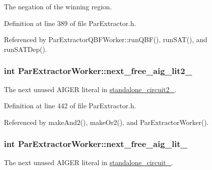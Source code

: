 The negation of the winning region. 



Definition at line 389 of file Par\-Extractor.\-h.



Referenced by Par\-Extractor\-Q\-B\-F\-Worker\-::run\-Q\-B\-F(), run\-S\-A\-T(), and run\-S\-A\-T\-Dep().

\hypertarget{classParExtractorWorker_a334b3096ea7cdb2b3305ac3960aa065a}{
\subsubsection[{next\-\_\-free\-\_\-aig\-\_\-lit2\-\_\-}]{\setlength{\rightskip}{0pt plus 5cm}int Par\-Extractor\-Worker\-::next\-\_\-free\-\_\-aig\-\_\-lit2\-\_\-\hspace{0.3cm}{\ttfamily [protected]}}}\label{classParExtractorWorker_a334b3096ea7cdb2b3305ac3960aa065a}


The next unused A\-I\-G\-E\-R literal in \hyperlink{classParExtractorWorker_a304c66039a45652e273876f7c6da8bcf}{standalone\-\_\-circuit2\-\_\-}. 



Definition at line 442 of file Par\-Extractor.\-h.



Referenced by make\-And2(), make\-Or2(), and Par\-Extractor\-Worker().

\hypertarget{classParExtractorWorker_a07219034862a2f4dabe22ecdc0d04ae0}{
\subsubsection[{next\-\_\-free\-\_\-aig\-\_\-lit\-\_\-}]{\setlength{\rightskip}{0pt plus 5cm}int Par\-Extractor\-Worker\-::next\-\_\-free\-\_\-aig\-\_\-lit\-\_\-\hspace{0.3cm}{\ttfamily [protected]}}}\label{classParExtractorWorker_a07219034862a2f4dabe22ecdc0d04ae0}


The next unused A\-I\-G\-E\-R literal in \hyperlink{classParExtractorWorker_a233a7f99946695b0640e76ead6932fbb}{standalone\-\_\-circuit\-\_\-}. 



